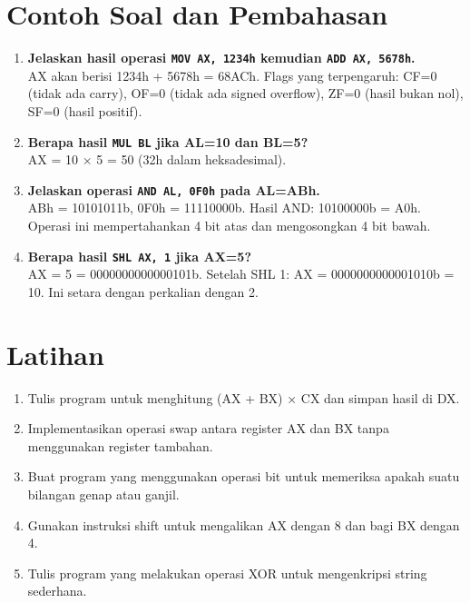 \documentclass[../main.tex]{subfiles}
\begin{document}
\section{Contoh Soal dan Pembahasan}\label{sec:instruksi-dasar-contoh}
\begin{enumerate}
    \item \textbf{Jelaskan hasil operasi \texttt{MOV AX, 1234h} kemudian \texttt{ADD AX, 5678h}.}\\
    AX akan berisi 1234h + 5678h = 68ACh. Flags yang terpengaruh: CF=0 (tidak ada carry), OF=0 (tidak ada signed overflow), ZF=0 (hasil bukan nol), SF=0 (hasil positif).

    \item \textbf{Berapa hasil \texttt{MUL BL} jika AL=10 dan BL=5?}\\
    AX = 10 × 5 = 50 (32h dalam heksadesimal).

    \item \textbf{Jelaskan operasi \texttt{AND AL, 0F0h} pada AL=ABh.}\\
    ABh = 10101011b, 0F0h = 11110000b. Hasil AND: 10100000b = A0h. Operasi ini mempertahankan 4 bit atas dan mengosongkan 4 bit bawah.

    \item \textbf{Berapa hasil \texttt{SHL AX, 1} jika AX=5?}\\
    AX = 5 = 0000000000000101b. Setelah SHL 1: AX = 0000000000001010b = 10. Ini setara dengan perkalian dengan 2.
\end{enumerate}

\section{Latihan}\label{sec:instruksi-dasar-latihan}
\begin{enumerate}
    \item Tulis program untuk menghitung (AX + BX) × CX dan simpan hasil di DX.
    \item Implementasikan operasi swap antara register AX dan BX tanpa menggunakan register tambahan.
    \item Buat program yang menggunakan operasi bit untuk memeriksa apakah suatu bilangan genap atau ganjil.
    \item Gunakan instruksi shift untuk mengalikan AX dengan 8 dan bagi BX dengan 4.
    \item Tulis program yang melakukan operasi XOR untuk mengenkripsi string sederhana.
\end{enumerate}
\end{document}
